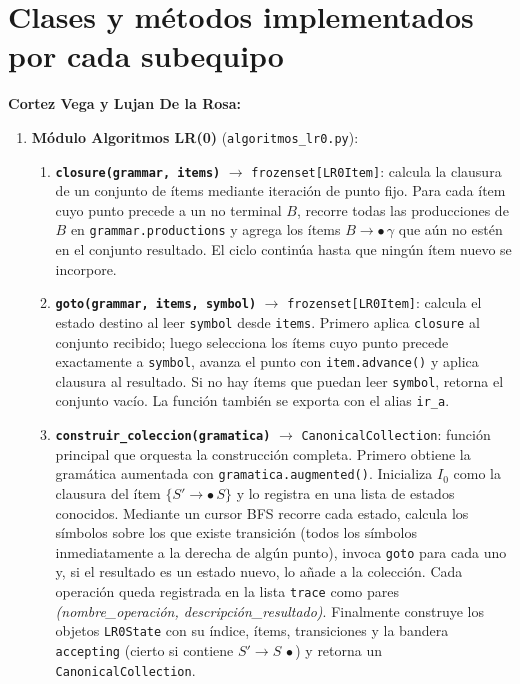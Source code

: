 \section{Clases y métodos implementados por cada subequipo}

\textbf{Cortez Vega y Lujan De la Rosa:}

\begin{enumerate}
  \item \textbf{Módulo Algoritmos LR(0)} (\texttt{algoritmos\_lr0.py}):

    \begin{enumerate}[label=\alph*.]
      \item \textbf{\texttt{closure(grammar, items)}} $\to$ \texttt{frozenset[LR0Item]}:
        calcula la clausura de un conjunto de ítems mediante iteración de punto fijo.
        Para cada ítem cuyo punto precede a un no terminal $B$, recorre todas las
        producciones de $B$ en \texttt{grammar.productions} y agrega los ítems
        $B \to \bullet\,\gamma$ que aún no estén en el conjunto resultado.
        El ciclo continúa hasta que ningún ítem nuevo se incorpore.

      \item \textbf{\texttt{goto(grammar, items, symbol)}} $\to$ \texttt{frozenset[LR0Item]}:
        calcula el estado destino al leer \texttt{symbol} desde \texttt{items}.
        Primero aplica \texttt{closure} al conjunto recibido; luego selecciona los ítems
        cuyo punto precede exactamente a \texttt{symbol}, avanza el punto con
        \texttt{item.advance()} y aplica clausura al resultado.
        Si no hay ítems que puedan leer \texttt{symbol}, retorna el conjunto vacío.
        La función también se exporta con el alias \texttt{ir\_a}.

      \item \textbf{\texttt{construir\_coleccion(gramatica)}} $\to$ \texttt{CanonicalCollection}:
        función principal que orquesta la construcción completa. Primero obtiene la
        gramática aumentada con \texttt{gramatica.augmented()}. Inicializa $I_0$ como
        la clausura del ítem $\{S' \to \bullet\,S\}$ y lo registra en una lista de
        estados conocidos. Mediante un cursor BFS recorre cada estado, calcula los
        símbolos sobre los que existe transición (todos los símbolos inmediatamente a la
        derecha de algún punto), invoca \texttt{goto} para cada uno y, si el resultado
        es un estado nuevo, lo añade a la colección. Cada operación queda registrada en
        la lista \texttt{trace} como pares \textit{(nombre\_operación, descripción\_resultado)}.
        Finalmente construye los objetos \texttt{LR0State} con su índice, ítems,
        transiciones y la bandera \texttt{accepting} (cierto si contiene
        $S' \to S\,\bullet$) y retorna un \texttt{CanonicalCollection}.


\end{enumerate}
\end{enumerate}
